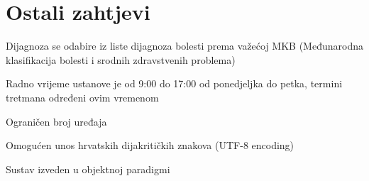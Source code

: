 	
	
	
	\begin{comment}
			\textbf{Opis sekvencijskog dijagrama UC13}
		\begin{flushleft}
			Bolesnik iz svog korisničkog sučelja izabire pregled izvješća. Sustav iz baze dohvaća sva izvješća te ako ne postoje o tome obavještava bolesnika. Sustav prikazuje bolesniku listu svih izvješća koja su za njega izrađena te bolesnik odabire ono koje želi pregledati i koje želi da mu se pošalje na adresu e-pošte. U slučaju da ne postoji zapis o bolesnikovoj adresi e-pošte (pri registraciji ju nije koristio/naveo), sustav traži od bolesnika da unese adresu e-pošte te mu na nju šalje odabrano izvješće. U suprotnom sustav izvješće šalje na adresu e-pošte bolesnika koja je zapisana u bazi podataka.
		\end{flushleft}
		
		\begin{figure}[H]
			\texttt{[image: slike/seq\_UC13.jpg]} %
			\centering
			\caption{Sekvencijski dijagram UC13}
			\label{fig:seqUC13}			
		\end{figure}	content...
	\end{comment}

			
			
	
		
	
				
		\pagebreak
		\section{Ostali zahtjevi}
		
		 
			 
			 \begin{packed_enum}
			 	\item Dijagnoza se odabire iz liste dijagnoza bolesti prema važećoj MKB (Međunarodna klasifikacija
			 	bolesti i srodnih zdravstvenih problema)
			 	
			 	\item Radno vrijeme ustanove je od 9:00 do 17:00 od ponedjeljka do petka, termini tretmana određeni ovim vremenom
			 	
			 	\item Ograničen broj uređaja 
			 	\item Omogućen unos hrvatskih dijakritičkih znakova (UTF-8 encoding)
			 	\item Sustav izveden u objektnoj paradigmi
			 \end{packed_enum}
			 
			 
			 
	